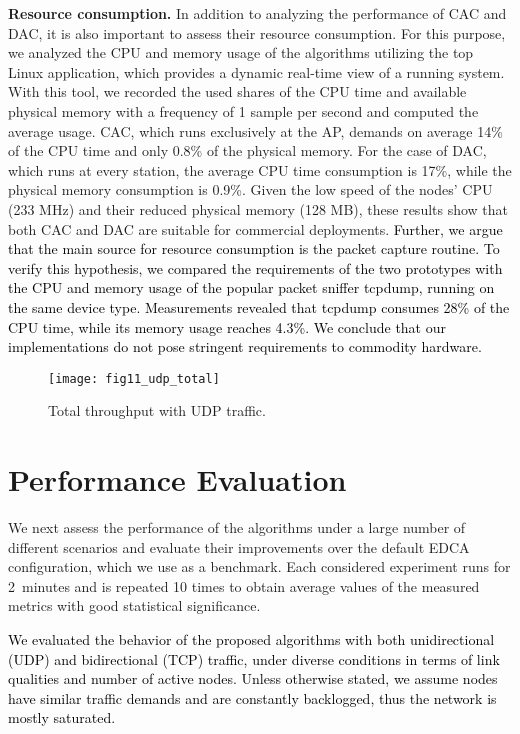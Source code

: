 \documentclass[a4paper,10pt]{article}
\newcommand{\revs}[1]{\textcolor{black}{#1}}
\begin{document}
\vspace{0.25em}
{\bf Resource consumption.} In addition to analyzing the performance of CAC and DAC, it is also important to assess their resource consumption. For this purpose, we analyzed the CPU and memory usage of the algorithms utilizing the {\ttfamily top} Linux application, which provides a dynamic real-time view of a running system. With this tool, we recorded the used shares of the CPU time and available physical memory with a frequency of 1 sample per second and computed the average usage. CAC, which runs exclusively at the AP, demands on average 14\% of the CPU time and only 0.8\% of the physical memory. For the case of DAC, which runs at every station, the average CPU time consumption is 17\%, while the physical memory consumption is 0.9\%. Given the low speed of the nodes' CPU (233 MHz) and their reduced physical memory (128 MB), these results show that both CAC and DAC are suitable for commercial deployments. \revs{Further, we argue that the main source for resource consumption is the packet capture routine. To verify this hypothesis, we compared the requirements of the two prototypes with the CPU and memory usage of the popular packet sniffer {\ttfamily tcpdump}, running on the same device type. Measurements revealed that {\ttfamily tcpdump} consumes 28\% of the CPU time, while its memory usage reaches 4.3\%. We conclude that our implementations do not pose stringent requirements to commodity hardware.}


\begin{figure}[!t]\texttt{[image: fig11\_udp\_total]}\caption{Total throughput with UDP traffic. }\label{fig:udp_total}\end{figure}

\section{Performance Evaluation}
\label{sec:performance}

We next assess the performance of the algorithms under a large number of different scenarios and evaluate their improvements over the default EDCA configuration, which we use as a benchmark. Each considered experiment runs for 2~minutes and is repeated 10 times to obtain average values of the measured metrics with good statistical significance. 

\revs{We evaluated the behavior of the proposed algorithms with both unidirectional (UDP) and bidirectional (TCP) traffic, under diverse conditions in terms of link qualities and number of active nodes. Unless otherwise stated, we assume nodes have similar traffic demands and are constantly backlogged, thus the network is mostly saturated.}
\end{document}
